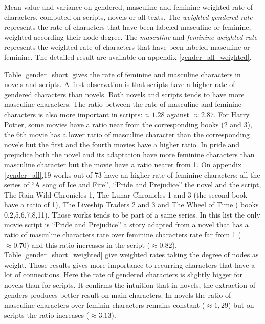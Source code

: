 \documentclass[a4paper, 12pt]{report}
\begin{document}
\begin{table}[]
\caption{Mean value and variance on gendered, masculine and feminine weighted rate of characters, computed on scripts, novels or all texts. The \textit{weighted gendered rate} represents the rate of characters that have been labeled masculine or feminine, weighted according their node degree. The \textit{masculine} and \textit{feminine weighted rate} represents the weighted rate of characters that have been labeled masculine or feminine. The detailed result are available on appendix \ref{gender_all_weighted}. }
 \label{gender_short_weighted}
\end{table}

Table \ref{gender_short} gives the rate of feminine and masculine characters in novels and scripts. A first observation is that scripts have a higher rate of gendered characters than novels. Both novels and scripts tends to have more masculine characters.
The ratio between the rate of masculine and feminine characters is also more important in scripts:$\approx 1.28$ against $\approx 2.87$. For Harry Potter, some movies have a ratio near from the corresponding books (2 and 3), the 6th movie has a lower ratio of masculine character than the corresponding novels but the first and the fourth movies have a higher ratio. In pride and prejudice both the novel and its adaptation have more feminine characters than masculine character but the movie have a ratio nearer from 1.
On appendix \ref{gender_all},19 works out of 73 have an higher rate of feminine characters: all the series of ``A song of Ice and Fire'', ``Pride and Prejudice'' the novel and the script, The Rain Wild Chronicles 1, The Lunar Chronicles 1 and 3 (the second book have a ratio of 1), The Liveship Traders 2 and 3 and The Wheel of Time ( books 0,2,5,6,7,8,11). Those works tends to be part of a same series. In this list the only movie script is ``Pride and Prejudice'' a story adapted from a novel that has a ratio of masculine characters rate over feminine characters rate far from 1 ($\approx 0.70$) and this ratio increases in the script ($\approx 0.82$).\\

Table \ref{gender_short_weighted} give weighted rates taking the degree of nodes as weight. Those results gives more importance to recurring characters that have a lot of connections. Here the rate of gendered characters is slightly bigger for novels than for scripts. It confirms the intuition that in novels, the extraction of genders produces better result on main characters. In novels the ratio of masculine characters over feminin characters remains constant ($\approx 1,29$) but on scripts the ratio increases ($\approx 3.13$).\\
\end{document}
